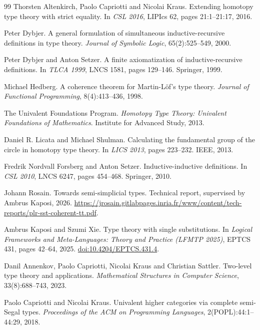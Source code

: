 \documentclass[11pt]{article}
\begin{document}
\begin{thebibliography}{99}
Thorsten Altenkirch, Paolo Capriotti and Nicolai Kraus.
\newblock Extending homotopy type theory with strict equality.
\newblock In \emph{CSL 2016}, LIPIcs 62, pages 21:1--21:17, 2016.

Peter Dybjer.
\newblock A general formulation of simultaneous inductive-recursive
  definitions in type theory.
\newblock \emph{Journal of Symbolic Logic}, 65(2):525--549, 2000.

Peter Dybjer and Anton Setzer.
\newblock A finite axiomatization of inductive-recursive definitions.
\newblock In \emph{TLCA 1999}, LNCS 1581, pages 129--146. Springer, 1999.

Michael Hedberg.
\newblock A coherence theorem for Martin-Löf's type theory.
\newblock \emph{Journal of Functional Programming}, 8(4):413--436, 1998.

The Univalent Foundations Program.
\newblock \emph{Homotopy Type Theory: Univalent Foundations of Mathematics}.
\newblock Institute for Advanced Study, 2013.

Daniel R. Licata and Michael Shulman.
\newblock Calculating the fundamental group of the circle in homotopy type
  theory.
\newblock In \emph{LICS 2013}, pages 223--232. IEEE, 2013.

Fredrik Nordvall Forsberg and Anton Setzer.
\newblock Inductive-inductive definitions.
\newblock In \emph{CSL 2010}, LNCS 6247, pages 454--468. Springer, 2010.

Johann Rosain.
\newblock Towards semi-simplicial types.
\newblock Technical report, supervised by Ambrus Kaposi, 2026.
\newblock \url{https://jrosain.gitlabpages.inria.fr/www/content/tech-reports/plr-sst-coherent-tt.pdf}.

Ambrus Kaposi and Szumi Xie.
\newblock Type theory with single substitutions.
\newblock In \emph{Logical Frameworks and Meta-Languages: Theory and Practice (LFMTP 2025)},
  EPTCS 431, pages 42--64, 2025. \href{https://doi.org/10.4204/EPTCS.431.4}{doi:10.4204/EPTCS.431.4}.

Danil Annenkov, Paolo Capriotti, Nicolai Kraus and Christian Sattler.
\newblock Two-level type theory and applications.
\newblock \emph{Mathematical Structures in Computer Science}, 33(8):688--743,
  2023.

Paolo Capriotti and Nicolai Kraus.
\newblock Univalent higher categories via complete semi-Segal types.
\newblock \emph{Proceedings of the ACM on Programming Languages}, 2(POPL):44:1--44:29,
  2018.


\end{thebibliography}
\end{document}
